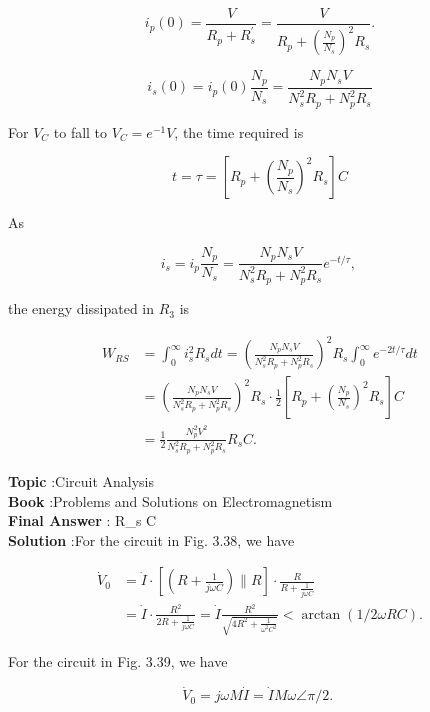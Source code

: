 \documentclass[10pt]{article}
\begin{document}
$$
i_{p}(0)=\frac{V}{R_{p}+R_{s}^{\prime}}=\frac{V}{R_{p}+\left(\frac{N_{p}}{N_{s}}\right)^{2} R_{s}} .
$$



$$
i_{s}(0)=i_{p}(0) \frac{N_{p}}{N_{s}}=\frac{N_{p} N_{s} V}{N_{s}^{2} R_{p}+N_{p}^{2} R_{s}}
$$

 For $V_{C}$ to fall to $V_{C}=e^{-1} V$, the time required is

$$
t=\tau=\left[R_{p}+\left(\frac{N_{p}}{N_{s}}\right)^{2} R_{s}\right] C
$$

 As

$$
i_{s}=i_{p} \frac{N_{p}}{N_{s}}=\frac{N_{p} N_{s} V}{N_{s}^{2} R_{p}+N_{p}^{2} R_{s}} e^{-t / \tau} \text {, }
$$

the energy dissipated in $R_{3}$ is

$$
\begin{aligned}
W_{R S} &=\int_{0}^{\infty} i_{s}^{2} R_{s} d t=\left(\frac{N_{p} N_{s} V}{N_{s}^{2} R_{p}+N_{p}^{2} R_{s}}\right)^{2} R_{s} \int_{0}^{\infty} e^{-2 t / \tau} d t \\
&=\left(\frac{N_{p} N_{s} V}{N_{s}^{2} R_{p}+N_{p}^{2} R_{s}}\right)^{2} R_{s} \cdot \frac{1}{2}\left[R_{p}+\left(\frac{N_{p}}{N_{s}}\right)^{2} R_{s}\right] C \\
&=\frac{1}{2} \frac{N_{p}^{2} V^{2}}{N_{s}^{2} R_{p}+N_{p}^{2} R_{s}} R_{s} C .
\end{aligned}
$$

\textbf{Topic} :Circuit Analysis\\
\textbf{Book} :Problems and Solutions on Electromagnetism\\
\textbf{Final Answer} :  R_{s} C\\


\textbf{Solution} :For the circuit in Fig. 3.38, we have

$$
\begin{aligned}
\dot{V}_{0} &=\dot{I} \cdot\left[\left(R+\frac{1}{j \omega C}\right) \| R\right] \cdot \frac{R}{R+\frac{1}{j \omega C}} \\
&=\dot{I} \cdot \frac{R^{2}}{2 R+\frac{1}{j \omega C}}=\dot{I} \frac{R^{2}}{\sqrt{4 R^{2}+\frac{1}{\omega^{2} C^{2}}}}<\arctan (1 / 2 \omega R C) .
\end{aligned}
$$

For the circuit in Fig. 3.39, we have

$$
\dot{V}_{0}=j \omega M \dot{I}=\dot{I} M \omega \angle \pi / 2 \text {. }
$$
\end{document}
